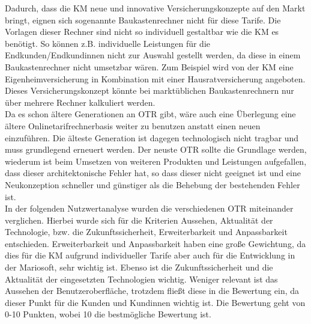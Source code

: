Dadurch, dass die \ac{KM} neue und innovative Versicherungskonzepte auf den Markt bringt, eignen sich sogenannte Baukastenrechner nicht für diese Tarife. Die Vorlagen dieser Rechner sind nicht so individuell gestaltbar wie die \ac{KM} es benötigt. So können z.B. individuelle Leistungen für die Endkunden/Endkundinnen nicht zur Auswahl gestellt werden, da diese in einem Baukastenrechner nicht umsetzbar wären. Zum Beispiel wird von der \ac{KM} eine Eigenheimversicherung in Kombination mit einer Hausratversicherung angeboten. Dieses Versicherungskonzept könnte bei marktüblichen Baukastenrechnern nur über mehrere Rechner kalkuliert werden.\\
Da es schon ältere Generationen an \ac{OTR} gibt, wäre auch eine Überlegung eine ältere Onlinetarifrechnerbasis weiter zu benutzen anstatt einen neuen einzuführen. Die älteste Generation ist dagegen technologisch nicht tragbar und muss grundlegend erneuert werden. Der neuste \ac{OTR} sollte die Grundlage werden, wiederum ist beim Umsetzen von weiteren Produkten und Leistungen aufgefallen, dass dieser architektonische Fehler hat, so dass dieser nicht geeignet ist und eine Neukonzeption schneller und günstiger als die Behebung der bestehenden Fehler ist.\\
In der folgenden Nutzwertanalyse wurden die verschiedenen \ac{OTR} miteinander verglichen. Hierbei wurde sich für die Kriterien Aussehen, Aktualität der Technologie, bzw. die Zukunftssicherheit, Erweiterbarkeit und Anpassbarkeit entschieden. Erweiterbarkeit und Anpassbarkeit haben eine große Gewichtung, da dies für die \ac{KM} aufgrund individueller Tarife aber auch für die Entwicklung in der Mariosoft, sehr wichtig ist. Ebenso ist die Zukunftssicherheit und die Aktualität der eingesetzten Technologien wichtig. Weniger relevant ist das Aussehen der Benutzeroberfläche, trotzdem fließt diese in die Bewertung ein, da dieser Punkt für die Kunden und Kundinnen wichtig ist. Die Bewertung geht von 0-10 Punkten, wobei 10 die bestmögliche Bewertung ist.\\

